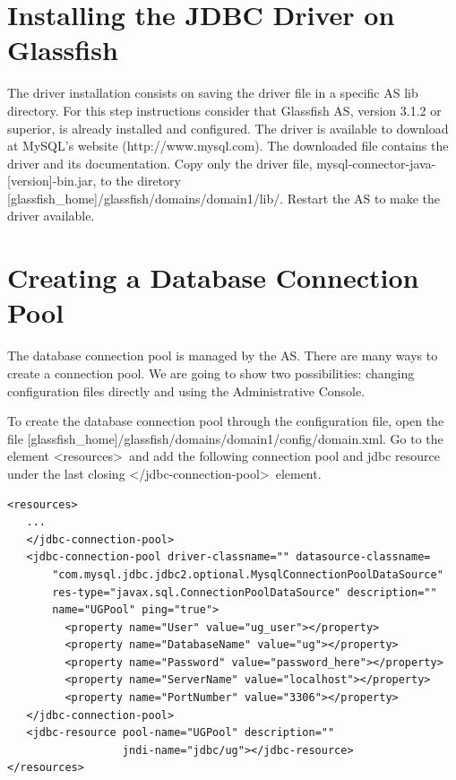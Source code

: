 \documentclass[envcountsame,envcountchap]{svmono}
\begin{document}
\section{Installing the JDBC Driver on Glassfish}

The driver installation consists on saving the driver file in a specific AS lib directory. For this step instructions consider that Glassfish AS, version 3.1.2 or superior, is already installed and configured. The driver is available to download at MySQL's website (http://www.mysql.com). The downloaded file contains the driver and its documentation. Copy only the driver file, mysql-connector-java-[version]-bin.jar, to the diretory [glassfish\_home]/glassfish/domains/domain1/lib/. Restart the AS to make the driver available.

\section{Creating a Database Connection Pool}
\label{sec:creating-database-connection-pool}

The database connection pool is managed by the AS. There are many ways to create a connection pool. We are going to show two possibilities: changing configuration files directly and using the Administrative Console.

To create the database connection pool through the configuration file, open the file [glassfish\_home]/glassfish/domains/domain1/config/domain.xml. Go to the element \textless resources\textgreater \ and add the following connection pool and jdbc resource under the last closing \textless /jdbc-connection-pool\textgreater \ element.

\begin{verbatim}
<resources>
   ...
   </jdbc-connection-pool>
   <jdbc-connection-pool driver-classname="" datasource-classname=
       "com.mysql.jdbc.jdbc2.optional.MysqlConnectionPoolDataSource"
       res-type="javax.sql.ConnectionPoolDataSource" description="" 
       name="UGPool" ping="true">
         <property name="User" value="ug_user"></property>
         <property name="DatabaseName" value="ug"></property>
         <property name="Password" value="password_here"></property>
         <property name="ServerName" value="localhost"></property>
         <property name="PortNumber" value="3306"></property>
   </jdbc-connection-pool>
   <jdbc-resource pool-name="UGPool" description="" 
                  jndi-name="jdbc/ug"></jdbc-resource>
</resources>
\end{verbatim}
\end{document}
